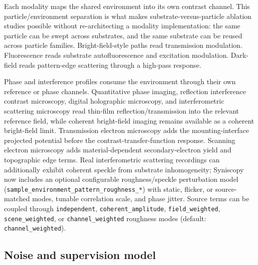 Each modality maps the shared environment into its own contrast channel. This particle/environment separation is what makes substrate-versus-particle ablation studies possible without re-architecting a modality implementation: the same particle can be swept across substrates, and the same substrate can be reused across particle families. Bright-field-style paths read transmission modulation. Fluorescence reads substrate autofluorescence and excitation modulation. Dark-field reads pattern-edge scattering through a high-pass response.

Phase and interference profiles consume the environment through their own reference or phase channels. Quantitative phase imaging, reflection interference contrast microscopy, digital holographic microscopy, and interferometric scattering microscopy read thin-film reflection/transmission into the relevant reference field, while coherent bright-field imaging remains available as a coherent bright-field limit. Transmission electron microscopy adds the mounting-interface projected potential before the contrast-transfer-function response. Scanning electron microscopy adds material-dependent secondary-electron yield and topographic edge terms. Real interferometric scattering recordings can additionally exhibit coherent speckle from substrate inhomogeneity; Syniscopy now includes an optional configurable roughness/speckle perturbation model (\texttt{sample\_environment\_pattern\_roughness\_*}) with static, flicker, or source-matched modes, tunable correlation scale, and phase jitter. Source terms can be coupled through \texttt{independent}, \texttt{coherent\_amplitude}, \texttt{field\_weighted}, \texttt{scene\_weighted}, or \texttt{channel\_weighted} roughness modes (default: \texttt{channel\_weighted}).

\subsection{Noise and supervision model}
\label{sec:supervision}

